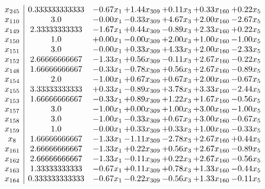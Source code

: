 \documentclass[8pt]{article}
\begin{document}
\[\begin{array}{c| c c@{\hskip 2pt} c@{\hskip 2pt} c@{\hskip 2pt} c@{\hskip 2pt} c@{\hskip 2pt} }
 x_{245}   &  0.333333333333 & -0.67 x_{1} & +  1.44 x_{309} & +  0.11 x_{3} & +  0.33 x_{160} & +  0.22 x_{5}\\
 x_{110}   &  3.0 & -0.00 x_{1} & -0.33 x_{309} & +  4.67 x_{3} & +  2.00 x_{160} & -2.67 x_{5}\\
 x_{149}   &  2.33333333333 & -1.67 x_{1} & +  0.44 x_{309} & -0.89 x_{3} & +  2.33 x_{160} & +  0.22 x_{5}\\
 x_{150}   &  1.0 & +  0.00 x_{1} & -0.00 x_{309} & +  2.00 x_{3} & +  1.00 x_{160} & -1.00 x_{5}\\
 x_{151}   &  3.0 & -0.00 x_{1} & +  0.33 x_{309} & +  4.33 x_{3} & +  2.00 x_{160} & -2.33 x_{5}\\
 x_{152}   &  2.66666666667 & -1.33 x_{1} & +  0.56 x_{309} & -0.11 x_{3} & +  2.67 x_{160} & -0.22 x_{5}\\
 x_{148}   &  1.66666666667 & -0.33 x_{1} & -0.78 x_{309} & +  0.56 x_{3} & +  2.67 x_{160} & -0.89 x_{5}\\
 x_{154}   &  2.0 & -1.00 x_{1} & +  0.67 x_{309} & +  0.67 x_{3} & +  2.00 x_{160} & -0.67 x_{5}\\
 x_{155}   &  3.33333333333 & +  0.33 x_{1} & -0.89 x_{309} & +  3.78 x_{3} & +  3.33 x_{160} & -2.44 x_{5}\\
 x_{153}   &  1.66666666667 & -0.33 x_{1} & +  0.89 x_{309} & +  1.22 x_{3} & +  1.67 x_{160} & -0.56 x_{5}\\
 x_{157}   &  3.0 & -1.00 x_{1} & +  0.00 x_{309} & +  1.00 x_{3} & +  3.00 x_{160} & -1.00 x_{5}\\
 x_{158}   &  3.0 & -1.00 x_{1} & -0.33 x_{309} & +  0.67 x_{3} & +  3.00 x_{160} & -0.67 x_{5}\\
 x_{159}   &  1.0 & -0.00 x_{1} & +  0.33 x_{309} & +  0.33 x_{3} & +  1.00 x_{160} & -0.33 x_{5}\\
 x_{8}   &  1.66666666667 & -1.33 x_{1} & -1.11 x_{309} & -2.78 x_{3} & +  2.67 x_{160} & +  0.44 x_{5}\\
 x_{161}   &  2.66666666667 & -1.33 x_{1} & +  0.22 x_{309} & +  0.56 x_{3} & +  2.67 x_{160} & -0.89 x_{5}\\
 x_{162}   &  2.66666666667 & -1.33 x_{1} & -0.11 x_{309} & +  0.22 x_{3} & +  2.67 x_{160} & -0.56 x_{5}\\
 x_{163}   &  1.33333333333 & -0.67 x_{1} & +  0.11 x_{309} & +  0.78 x_{3} & +  1.33 x_{160} & -0.44 x_{5}\\
 x_{164}   &  0.333333333333 & -0.67 x_{1} & -0.22 x_{309} & -0.56 x_{3} & +  1.33 x_{160} & -0.11 x_{5}\\

\end{array}\]
\end{document}
